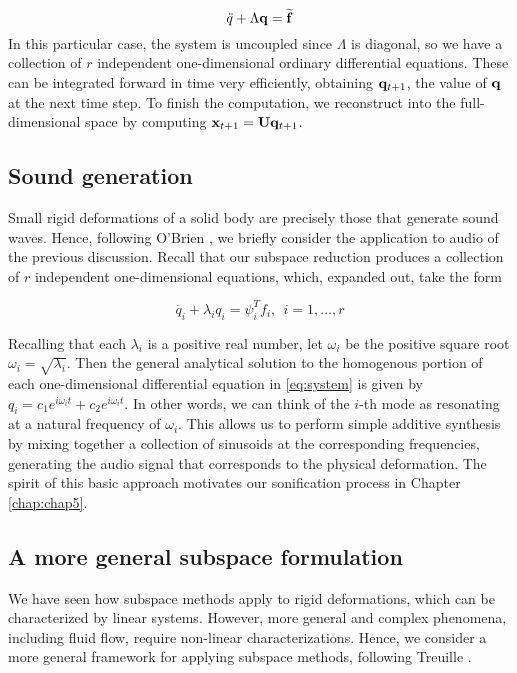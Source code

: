 {\begin{equation}
\ddot{q} + \Lambda \mathbf{q} = \widetilde{\mathbf{f}}
\end{equation}
In this particular case, the system is uncoupled since $\Lambda$ is diagonal, so we have a collection of $r$ independent one-dimensional ordinary differential equations. These can be integrated forward in time very efficiently, obtaining $\mathbf{q}_{t+1}$, the value of $\mathbf{q}$ at the next time step. To finish the computation, we reconstruct into the full-dimensional space by computing $\mathbf{x}_{t+1} = \mathbf{U} \mathbf{q}_{t+1}$.

\subsection{Sound generation}
Small rigid deformations of a solid body are precisely those that generate sound waves. Hence, following O'Brien \cite{O'Brien:2001:SSP:945191.945250}, we briefly consider the application to audio of the previous discussion. Recall that our subspace reduction produces a collection of $r$ independent one-dimensional equations, which, expanded out, take the form

\begin{equation}
\label{eq:system}
\ddot{q_i} + \lambda_i q_i = \psi_i^{T} f_i, \ \ i = 1, \dots, r
\end{equation}

Recalling that each $\lambda_i$ is a positive real number, let $\omega_i$ be the positive square root $\omega_i = \sqrt{\lambda_i}$. Then the general analytical solution to the homogenous portion of each one-dimensional differential equation in \ref{eq:system} is given by $q_i = c_1 e^{i \omega_i t} + c_2 e^{i \omega_i t}$. In other words, we can think of the $i$-th mode as resonating at a natural frequency of $\omega_i$. This allows us to perform simple additive synthesis by mixing together a collection of sinusoids at the corresponding frequencies, generating the audio signal that corresponds to the physical deformation. The spirit of this basic approach motivates
our sonification process in Chapter \ref{chap:chap5}.

\subsection{A more general subspace formulation}
We have seen how subspace methods apply to rigid deformations, which can be characterized by linear systems. However, more general and complex phenomena, including fluid flow, require non-linear characterizations. Hence, we consider a more general framework for applying subspace methods, following Treuille 
\cite{Treuille:2006:MRF}.

}
